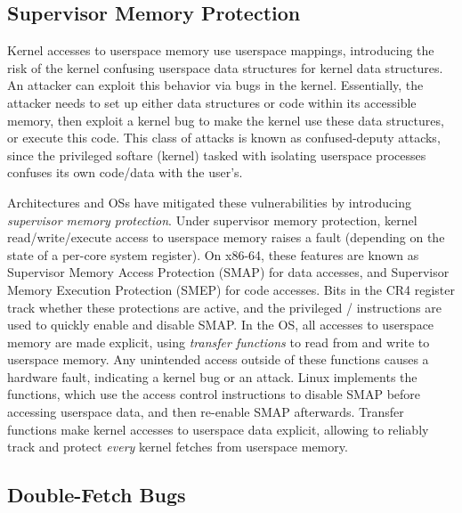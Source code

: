 \subsection{Supervisor Memory Protection} %

Kernel accesses to userspace memory use userspace mappings, introducing
the risk of the kernel confusing userspace data structures
for kernel data structures.
An attacker can exploit this behavior via bugs in the
kernel.
Essentially, the attacker needs to set up either data structures
or code within its accessible memory, then exploit a kernel
bug to make the kernel use these data structures, or execute
this code.
This class of attacks is known as confused-deputy attacks, since the
privileged softare (kernel) tasked with isolating userspace processes
confuses its own code/data with the user's.

Architectures and OSs have mitigated these vulnerabilities
by introducing \emph{supervisor memory protection}.
Under supervisor memory protection, kernel read/write/execute access to 
userspace memory raises a fault (depending on the state of a per-core system
register).
On x86-64, these features are known as Supervisor Memory Access
Protection (SMAP) for data accesses, and Supervisor Memory Execution
Protection (SMEP) for code accesses. 
Bits in the CR4 register track whether these protections are active, 
and the privileged / instructions are used to 
quickly enable and disable SMAP.
In the OS, all accesses to userspace memory are made explicit,
using \emph{transfer functions} to read from and write to userspace memory.
Any unintended access outside of these functions causes a
hardware fault, indicating a kernel bug or an attack.
Linux implements the  functions, which
use the access control instructions to disable SMAP before
accessing userspace data, and then re-enable SMAP afterwards.  
Transfer functions make
kernel accesses to userspace data explicit, allowing
\midas to reliably track and protect \emph{every} kernel fetches 
from userspace memory.

\subsection{Double-Fetch Bugs}

